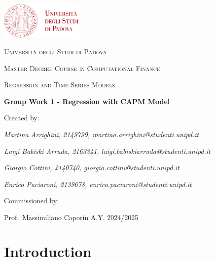 \documentclass[12pt, openright, oneside]{report}
\begin{document}

    \begin{titlepage}
        \centering
        \includegraphics[width=0.3\textwidth]{images/logo_unipd.png}\par\vspace{1cm}
        {\scshape\LARGE Università degli Studi di Padova \par}
        \vspace{1.5cm}
        {\scshape\Large Master Degree Course in Computational Finance \par}
        \vspace{.2cm}
        {\scshape\large Regression and Time Series Models \par}
        \vspace{2cm}
        {\Large\bfseries Group Work 1 - Regression with CAPM Model\par}
        \vspace{2cm}
        Created by:\par
        {\itshape{Martina Arrighini, 2149799, martina.arrighini@studenti.unipd.it}\par}
        {\itshape{Luigi Babiski Arruda, 2163341, luigi.babiskiarruda@studenti.unipd.it}\par}
        {\itshape{Giorgio Cottini, 2140740, giorgio.cottini@studenti.unipd.it}\par}
        {\itshape{Enrico Paciaroni, 2139678, enrico.paciaroni@studenti.unipd.it}\par}
        \vfill
        Commissioned by:\par
        Prof.\ Massimiliano Caporin
        \vfill
        {\large A.Y. 2024/2025}
    \end{titlepage}

\setcounter{page}{1}

\tableofcontents

\chapter*{Introduction}
\end{document}

